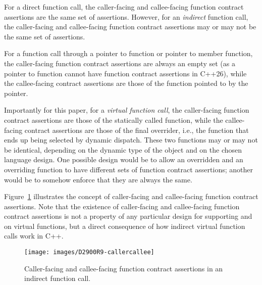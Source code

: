For a direct function call, the caller-facing and callee-facing function contract assertions are the same set of assertions. However, for an \emph{indirect} function call, the caller-facing and callee-facing function contract assertions may or may not be the same set of assertions. 

For a function call through a pointer to function or pointer to member function, the caller-facing function contract assertions are always an empty set (as a pointer to function cannot have function contract assertions in C++26), while the callee-facing contract assertions are those of the function pointed to by the pointer.

Importantly for this paper, for a \emph{virtual function call}, the caller-facing function contract assertions are those of the statically called function, while the callee-facing contract assertions are those of the final overrider, i.e., the function that ends up being selected by dynamic dispatch. These two functions may or may not be identical, depending on the dynamic type of the object and on the chosen language design. One possible design would be to allow an overridden and an overriding function to have different sets of function contract assertions; another would be to somehow enforce that they are always the same.

Figure~\ref{fig_callercallee} illustrates the concept of caller-facing and callee-facing function contract assertions. Note that the existence of caller-facing and callee-facing function contract assertions is not a property of any particular design for supporting  and  on virtual functions, but a direct consequence of how indirect virtual function calls work in C++.

\begin{figure}[b]
\begin{center}
\texttt{[image: images/D2900R9-callercallee]}
\end{center}
\caption{Caller-facing and callee-facing function contract assertions in an indirect function call.}
\label{fig_callercallee}
\end{figure}

